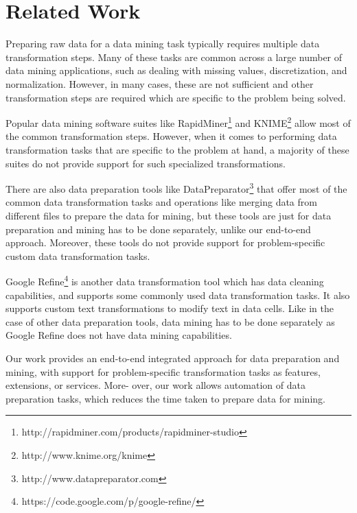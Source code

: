 \section{Related Work}

Preparing raw data for a data mining task typically requires multiple data transformation steps. Many of these tasks are common across a large number of data mining applications, such as dealing with missing values, discretization, and normalization. However, in many cases, these are not sufficient and other transformation steps are required which are specific to the problem being solved.

Popular data mining software suites like RapidMiner\footnote{http://rapidminer.com/products/rapidminer-studio} and KNIME\footnote{http://www.knime.org/knime} allow most of the common transformation steps. However, when it comes to performing data transformation tasks that are specific to the problem at hand, a majority of these suites do not provide support for such specialized transformations.

There are also data preparation tools like DataPreparator\footnote{http://www.datapreparator.com} that offer most of the common data transformation tasks and operations like merging data from different files to prepare the data for mining, but these tools are just for data preparation and mining has to be done separately, unlike our end-to-end approach. Moreover, these tools do not provide support for problem-specific custom data transformation tasks.

Google Refine\footnote{https://code.google.com/p/google-refine/} is another data transformation tool which has data cleaning capabilities, and supports some commonly used data transformation tasks. It also supports custom text transformations to modify text in data cells. Like in the case of other data preparation tools, data mining has to be done separately as Google Refine does not have data mining capabilities.

Our work provides an end-to-end integrated approach for data preparation and mining, with support for problem-specific transformation tasks as features, extensions, or services. More- over, our work allows automation of data preparation tasks, which reduces the time taken to prepare data for mining.